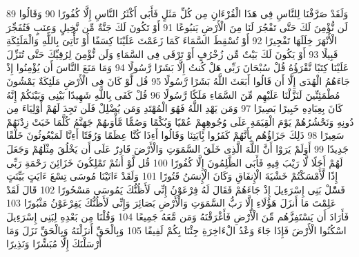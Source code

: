 \documentclass[20pt,a4paper]{article}
\begin{document}
{\tiny\colorbox{cl_aya}{89}} وَلَقَدْ صَرَّفْنَا لِلنَّاسِ فِى هَذَا الْقُرْءَانِ مِن كُلِّ مَثَلٍ فَأَبَى أَكْثَرُ النَّاسِ إِلَّا كُفُورًا
{\tiny\colorbox{cl_aya}{90}} وَقَالُوا لَن نُّؤْمِنَ لَكَ حَتَّى تَفْجُرَ لَنَا مِنَ الْأَرْضِ يَنبُوعًا
{\tiny\colorbox{cl_aya}{91}} أَوْ تَكُونَ لَكَ جَنَّةٌ مِّن نَّخِيلٍ وَعِنَبٍ فَتُفَجِّرَ الْأَنْهَرَ خِلَلَهَا تَفْجِيرًا
{\tiny\colorbox{cl_aya}{92}} أَوْ تُسْقِطَ السَّمَاءَ كَمَا زَعَمْتَ عَلَيْنَا كِسَفًا أَوْ تَأْتِىَ بِاللَّهِ وَالْمَلَئِكَةِ قَبِيلًا
{\tiny\colorbox{cl_aya}{93}} أَوْ يَكُونَ لَكَ بَيْتٌ مِّن زُخْرُفٍ أَوْ تَرْقَى فِى السَّمَاءِ وَلَن نُّؤْمِنَ لِرُقِيِّكَ حَتَّى تُنَزِّلَ عَلَيْنَا كِتَبًا نَّقْرَؤُهُ قُلْ سُبْحَانَ رَبِّى هَلْ كُنتُ إِلَّا بَشَرًا رَّسُولًا
{\tiny\colorbox{cl_aya}{94}} وَمَا مَنَعَ النَّاسَ أَن يُؤْمِنُوا إِذْ جَاءَهُمُ الْهُدَى إِلَّا أَن قَالُوا أَبَعَثَ اللَّهُ بَشَرًا رَّسُولًا
{\tiny\colorbox{cl_aya}{95}} قُل لَّوْ كَانَ فِى الْأَرْضِ مَلَئِكَةٌ يَمْشُونَ مُطْمَئِنِّينَ لَنَزَّلْنَا عَلَيْهِم مِّنَ السَّمَاءِ مَلَكًا رَّسُولًا
{\tiny\colorbox{cl_aya}{96}} قُلْ كَفَى بِاللَّهِ شَهِيدًا بَيْنِى وَبَيْنَكُمْ إِنَّهُ كَانَ بِعِبَادِهِ خَبِيرًا بَصِيرًا
{\tiny\colorbox{cl_aya}{97}} وَمَن يَهْدِ اللَّهُ فَهُوَ الْمُهْتَدِ وَمَن يُضْلِلْ فَلَن تَجِدَ لَهُمْ أَوْلِيَاءَ مِن دُونِهِ وَنَحْشُرُهُمْ يَوْمَ الْقِيَمَةِ عَلَى وُجُوهِهِمْ عُمْيًا وَبُكْمًا وَصُمًّا مَّأْوَىهُمْ جَهَنَّمُ كُلَّمَا خَبَتْ زِدْنَهُمْ سَعِيرًا
{\tiny\colorbox{cl_aya}{98}} ذَلِكَ جَزَاؤُهُم بِأَنَّهُمْ كَفَرُوا بَِٔايَتِنَا وَقَالُوا أَءِذَا كُنَّا عِظَمًا وَرُفَتًا أَءِنَّا لَمَبْعُوثُونَ خَلْقًا جَدِيدًا
{\tiny\colorbox{cl_aya}{99}} أَوَلَمْ يَرَوْا أَنَّ اللَّهَ الَّذِى خَلَقَ السَّمَوَتِ وَالْأَرْضَ قَادِرٌ عَلَى أَن يَخْلُقَ مِثْلَهُمْ وَجَعَلَ لَهُمْ أَجَلًا لَّا رَيْبَ فِيهِ فَأَبَى الظَّلِمُونَ إِلَّا كُفُورًا
{\tiny\colorbox{cl_aya}{100}} قُل لَّوْ أَنتُمْ تَمْلِكُونَ خَزَائِنَ رَحْمَةِ رَبِّى إِذًا لَّأَمْسَكْتُمْ خَشْيَةَ الْإِنفَاقِ وَكَانَ الْإِنسَنُ قَتُورًا
{\tiny\colorbox{cl_aya}{101}} وَلَقَدْ ءَاتَيْنَا مُوسَى تِسْعَ ءَايَتٍ بَيِّنَتٍ فَسَْٔلْ بَنِى إِسْرَءِيلَ إِذْ جَاءَهُمْ فَقَالَ لَهُ فِرْعَوْنُ إِنِّى لَأَظُنُّكَ يَمُوسَى مَسْحُورًا
{\tiny\colorbox{cl_aya}{102}} قَالَ لَقَدْ عَلِمْتَ مَا أَنزَلَ هَؤُلَاءِ إِلَّا رَبُّ السَّمَوَتِ وَالْأَرْضِ بَصَائِرَ وَإِنِّى لَأَظُنُّكَ يَفِرْعَوْنُ مَثْبُورًا
{\tiny\colorbox{cl_aya}{103}} فَأَرَادَ أَن يَسْتَفِزَّهُم مِّنَ الْأَرْضِ فَأَغْرَقْنَهُ وَمَن مَّعَهُ جَمِيعًا
{\tiny\colorbox{cl_aya}{104}} وَقُلْنَا مِن بَعْدِهِ لِبَنِى إِسْرَءِيلَ اسْكُنُوا الْأَرْضَ فَإِذَا جَاءَ وَعْدُ الْءَاخِرَةِ جِئْنَا بِكُمْ لَفِيفًا
{\tiny\colorbox{cl_aya}{105}} وَبِالْحَقِّ أَنزَلْنَهُ وَبِالْحَقِّ نَزَلَ وَمَا أَرْسَلْنَكَ إِلَّا مُبَشِّرًا وَنَذِيرًا
\end{document}
